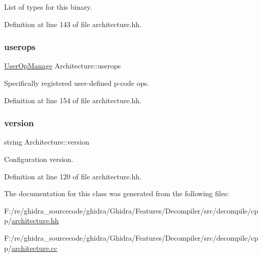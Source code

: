 List of types for this binary. 



Definition at line 143 of file architecture.\+hh.

\mbox{\label{class_architecture_abd9c927fbda44de1ab46122f49248003}} 
\subsubsection{\texorpdfstring{userops}{userops}}
{\footnotesize\ttfamily \mbox{\hyperlink{class_user_op_manage}{User\+Op\+Manage}} Architecture\+::userops}



Specifically registered user-\/defined p-\/code ops. 



Definition at line 154 of file architecture.\+hh.

\mbox{\label{class_architecture_a9fa6f1ec97e17635fb65b30c3b734efb}} 
\subsubsection{\texorpdfstring{version}{version}}
{\footnotesize\ttfamily string Architecture\+::version}



Configuration version. 



Definition at line 120 of file architecture.\+hh.



The documentation for this class was generated from the following files\+:\begin{DoxyCompactItemize}
\item 
F\+:/re/ghidra\+\_\+sourcecode/ghidra/\+Ghidra/\+Features/\+Decompiler/src/decompile/cpp/\mbox{\hyperlink{architecture_8hh}{architecture.\+hh}}\item 
F\+:/re/ghidra\+\_\+sourcecode/ghidra/\+Ghidra/\+Features/\+Decompiler/src/decompile/cpp/\mbox{\hyperlink{architecture_8cc}{architecture.\+cc}}\end{DoxyCompactItemize}
